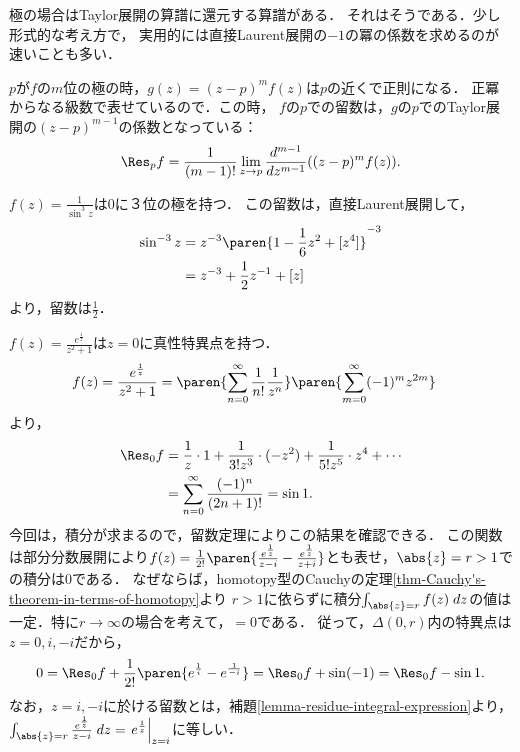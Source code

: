 \documentclass[uplatex, dvipdfmx]{jsreport}
\begin{document}
\begin{screen}
    極の場合はTaylor展開の算譜に還元する算譜がある．
    それはそうである．少し形式的な考え方で，
    実用的には直接Laurent展開の$-1$の冪の係数を求めるのが速いことも多い．
\end{screen}

\begin{discussion}\label{discussion-algorithm-for-residue}
    $p$が$f$の$m$位の極の時，$g(z)=(z-p)^mf(z)$は$p$の近くで正則になる．
    正冪からなる級数で表せているので．この時，
    $f$の$p$での留数は，$g$の$p$でのTaylor展開の$(z-p)^{m-1}$の係数となっている：
    \[\Res_pf=\frac{1}{(m-1)!}\lim_{z\to p}\frac{d^{m-1}}{dz^{m-1}}((z-p)^mf(z)).\]
\end{discussion}

\begin{example}
    $f(z)=\frac{1}{\sin^3z}$は$0$に３位の極を持つ．
    この留数は，直接Laurent展開して，
    \begin{align*}
        \sin^{-3}z&=z^{-3}\paren{1-\frac{1}{6}z^2+[z^4]}^{-3}\\
        &=z^{-3}+\frac{1}{2}z^{-1}+[z]
    \end{align*}
    より，留数は$\frac{1}{2}$．
\end{example}

\begin{example}
    $f(z)=\frac{e^{\frac{1}{z}}}{z^2+1}$は$z=0$に真性特異点を持つ．
    \begin{align*}
        f(z)&=\frac{e^{\frac{1}{z}}}{z^2+1}=\paren{\sum^\infty_{n=0}\frac{1}{n!}\frac{1}{z^n}}\paren{\sum^\infty_{m=0}(-1)^mz^{2m}}
    \end{align*}
    より，
    \begin{align*}
        \Res_0f&=\frac{1}{z}\cdot 1+\frac{1}{3!z^3}\cdot(-z^2)+\frac{1}{5!z^5}\cdot z^4+\cdots\\
        &=\sum^\infty_{n=0}\frac{(-1)^n}{(2n+1)!}=\sin 1.
    \end{align*}
    今回は，積分が求まるので，留数定理によりこの結果を確認できる．
    この関数は部分分数展開により$f(z)=\frac{1}{2!}\paren{\frac{e^{\frac{1}{z}}}{z-i}-\frac{e^{\frac{1}{z}}}{z+i}}$とも表せ，$\abs{z}=r>1$での積分は$0$である．
    なぜならば，homotopy型のCauchyの定理\ref{thm-Cauchy's-theorem-in-terms-of-homotopy}より
    $r>1$に依らずに積分$\int_{\abs{z}=r}f(z)\;dz$の値は一定．特に$r\to\infty$の場合を考えて，$=0$である．
    従って，$\Delta(0,r)$内の特異点は$z=0,i,-i$だから，
    \begin{align*}
        0=\Res_0f+\frac{1}{2!}\paren{e^{\frac{1}{i}}-e^{\frac{1}{-i}}}=\Res_0f+\sin (-1)=\Res_0f-\sin 1.
    \end{align*}
    なお，$z=i,-i$に於ける留数とは，補題\ref{lemma-residue-integral-expression}より，$\int_{\abs{z}=r}\frac{e^{\frac{1}{z}}}{z-i}\;dz=\left.e^{\frac{1}{z}}\right|_{z=i}$に等しい．
\end{example}
\end{document}
